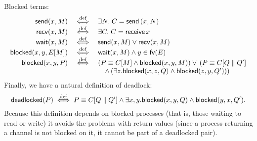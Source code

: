 \documentclass[orivec,envcountsame]{llncs}
\begin{document}
Blocked terms:
\newcommand{\sendp}{\mathsf{send}}
\newcommand{\recvp}{\mathsf{recv}}
\newcommand{\waitp}{\mathsf{wait}}
\newcommand{\blockedp}{\mathsf{blocked}}
\[\begin{array}{rcl}
  \sendp(x,M) &\defiff& \exists N. \; C = \gvconst{send} \app (x,N) \\
  \recvp(x,M) &\defiff& \exists C. \; C = \gvconst{receive} \app x \\
  \waitp(x,M) &\defiff& \sendp(x,M) \lor \recvp(x,M) \\
  \blockedp(x,y,E[M]) &\defiff& \waitp(x,M) \land y \in \fv(E) \\
  \blockedp(x,y,P) &\defiff& (P \equiv C[M] \land \blockedp(x,y,M)) \lor \, (P \equiv C[Q \parallel Q'] \\
  && \quad \land \, (\exists z. \blockedp(x,z,Q) \land \blockedp(z,y,Q')))
\end{array}\]
Finally, we have a natural definition of deadlock:
\newcommand{\deadlockp}{\ensuremath{\mathsf{deadlocked}}}
\[
\deadlockp(P) \defiff P \equiv C[Q \parallel Q'] \land \exists x,y. \blockedp(x,y,Q) \land \blockedp(y,x,Q').
\]
Because this definition depends on blocked processes (that is, those waiting to read or write) it
avoids the problems with return values (since a process returning a channel is not blocked on it, it
cannot be part of a deadlocked pair).

\end{document}
